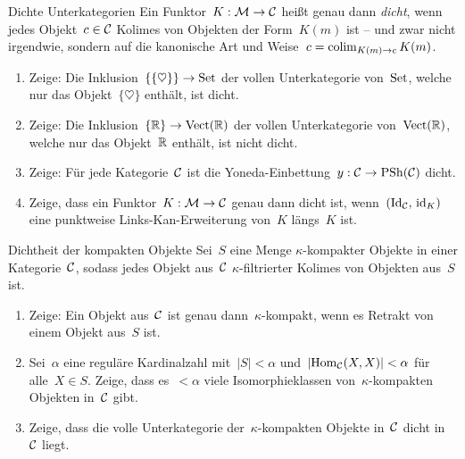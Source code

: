 \documentclass{uebblatt}
\begin{document}

\begin{aufgabe}{Dichte Unterkategorien}
Ein Funktor~$K : \mathcal{M} \to \mathcal{C}$ heißt genau dann \emph{dicht}, wenn jedes Objekt~$c
\in \mathcal{C}$ Kolimes von Objekten der Form~$K(m)$ ist -- und zwar nicht irgendwie,
sondern auf die kanonische Art und Weise~$c = \operatorname*{colim}_{K(m) \to c} K(m)$.
\begin{enumerate}
\item Zeige: Die Inklusion~$\{\{\heartsuit\}\} \to \mathrm{Set}$ der vollen
Unterkategorie von~$\mathrm{Set}$, welche nur das Objekt~$\{\heartsuit\}$ enthält, ist
dicht.
\item Zeige: Die Inklusion~$\{\mathbb{R}\} \to \mathrm{Vect}(\mathbb{R})$ der vollen
Unterkategorie von~$\mathrm{Vect}(\mathbb{R})$, welche nur das Objekt~$\mathbb{R}$ enthält, ist
nicht dicht.
\item Zeige: Für jede Kategorie~$\mathcal{C}$ ist die Yoneda-Einbettung~$y : \mathcal{C} \to
\mathrm{PSh}(\mathcal{C})$ dicht.
\item Zeige, dass ein Funktor~$K : \mathcal{M} \to \mathcal{C}$ genau dann dicht ist,
wenn~$(\mathrm{Id}_{\mathcal{C}},\,\mathrm{id}_K)$ eine punktweise Links-Kan-Erweiterung von~$K$
längs~$K$ ist.
\end{enumerate}
\end{aufgabe}

\begin{aufgabe}{Dichtheit der kompakten Objekte}
Sei~$S$ eine Menge $\kappa$-kompakter Objekte in einer Kategorie~$\mathcal{C}$,
sodass jedes Objekt aus~$\mathcal{C}$ $\kappa$-filtrierter Kolimes von Objekten aus~$S$
ist.
\begin{enumerate}
\item Zeige: Ein Objekt aus~$\mathcal{C}$ ist genau dann~$\kappa$-kompakt, wenn es
Retrakt von einem Objekt aus~$S$ ist.
\item Sei~$\alpha$ eine reguläre Kardinalzahl mit~$|S| < \alpha$
und~$|\mathrm{Hom}_{\mathcal{C}}(X,X)| < \alpha$ für alle~$X \in S$. Zeige, dass es~$< \alpha$
viele Isomorphieklassen von~$\kappa$-kompakten Objekten in~$\mathcal{C}$
gibt.
\item Zeige, dass die volle Unterkategorie der~$\kappa$-kompakten Objekte in~$\mathcal{C}$ dicht
in~$\mathcal{C}$ liegt.
\end{enumerate}
%
\end{aufgabe}
\end{document}
